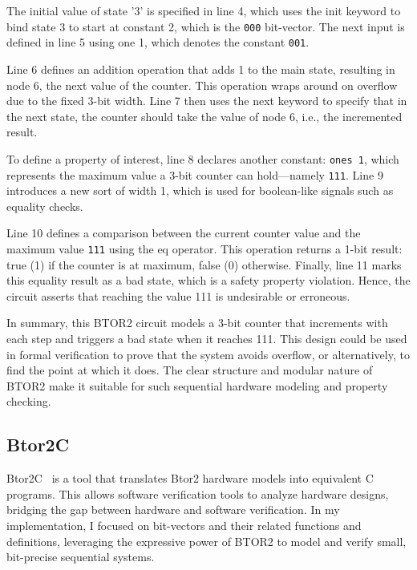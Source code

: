 The initial value of state '3' is specified in line 4, which uses the init keyword to bind state 3 to start at constant 2, which is the \verb|000| bit-vector. The next input is defined in line 5 using one 1, which denotes the constant \verb|001|.

Line 6 defines an addition operation that adds 1 to the main state, resulting in node 6, the next value of the counter. This operation wraps around on overflow due to the fixed 3-bit width. Line 7 then uses the next keyword to specify that in the next state, the counter should take the value of node 6, i.e., the incremented result.

To define a property of interest, line 8 declares another constant: \verb|ones 1|, which represents the maximum value a 3-bit counter can hold—namely \verb|111|. Line 9 introduces a new sort of width 1, which is used for boolean-like signals such as equality checks.

Line 10 defines a comparison between the current counter value and the maximum value \verb|111| using the eq operator. This operation returns a 1-bit result: true (1) if the counter is at maximum, false (0) otherwise. Finally, line 11 marks this equality result as a bad state, which is a safety property violation. Hence, the circuit asserts that reaching the value 111 is undesirable or erroneous.

In summary, this BTOR2 circuit models a 3-bit counter that increments with each step and triggers a bad state when it reaches 111. This design could be used in formal verification to prove that the system avoids overflow, or alternatively, to find the point at which it does. The clear structure and modular nature of BTOR2 make it suitable for such sequential hardware modeling and property checking.

\subsection{Btor2C}
Btor2C~\cite{btor2c} is a tool that translates Btor2 hardware models into equivalent C programs. This allows software verification tools to analyze hardware designs, bridging the gap between hardware and software verification.
In my implementation, I focused on bit-vectors and their related functions and definitions, leveraging the expressive power of BTOR2 to model and verify small, bit-precise sequential systems.

